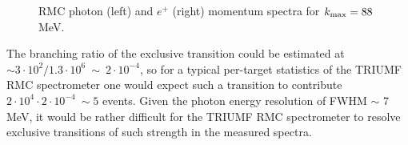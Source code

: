 \documentclass[12pt]{article}
\newcommand {\kmax}      {\mbox{$k_{\rm max}$}}
\begin{document}
\begin{figure}
  \hspace*{-1.3cm}%
  \caption {
    \label{fig:rmc_photon_and_positron_spectra}
    RMC photon (left) and $e^+$ (right) momentum spectra for $\kmax = 88$ MeV.
  }
\end{figure}

The branching ratio of the exclusive transition could be estimated at 
$\sim 3\cdot 10^2/1.3\cdot 10^6 ~ \sim ~ 2\cdot 10^{-4}$, so for a typical per-target
statistics of the TRIUMF RMC spectrometer one would expect such a transition
to contribute $2\cdot 10^4\cdot 2\cdot 10^{-4} ~\sim 5$ events.
Given the photon energy resolution of FWHM $\sim$ 7 MeV, it would be rather difficult
for the TRIUMF RMC spectrometer to resolve exclusive transitions of such strength
in the measured spectra. 


\newpage
\end{document}
